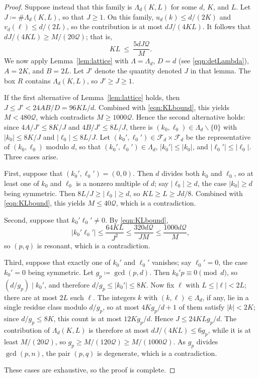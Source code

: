 \documentclass[12pt]{amsart}
\theoremstyle{definition}
\begin{document}
\begin{proof}
Suppose instead that this family is $\Lambda_d(K,L)$ for some $d$, $K$, and $L$.  Let $J\coloneq \#\Lambda_d(K,L)$, so that $J\ge1$.  On this family, $u_d(k)\le d/(2K)$ and $v_d(\ell)\le d/(2L)$, so the contribution is at most $dJ/(4KL)$.  It follows that $dJ/(4KL)\ge M/(20 \mathcal{Q})$; that is,
\begin{equation}
\label{eqn:KLbound}
KL\ \le\ \frac{5 d J \mathcal{Q}}{M}.
\end{equation}
We now apply Lemma~\ref{lem:lattice} with $\Lambda=\Lambda_d$, $D=d$ (see \eqref{eqn:detLambda}), $A=2K$, and $B=2L$.  Let $J'$ denote the quantity denoted $J$ in that lemma.  The box $R$ contains $\Lambda_d(K,L)$, so $J'\ge J\ge1$.

If the first alternative of Lemma~\ref{lem:lattice} holds, then $J\le J'<24AB/D=96KL/d$.  Combined with \eqref{eqn:KLbound}, this yields $M<480 \mathcal{Q}$, which contradicts $M\ge1000 \mathcal{Q}$.  Hence the second alternative holds: since $4A/J'\le8K/J$ and $4B/J'\le8L/J$, there is $(k_0,\ell_0)\in\Lambda_d\smallsetminus\{0\}$ with $|k_0|\le8K/J$ and $|\ell_0|\le8L/J$.  Let $(k_0',\ell_0')\in\mathcal{F}_d\times\mathcal{F}_d$ be the representative of $(k_0,\ell_0)$ modulo $d$, so that $(k_0',\ell_0')\in\Lambda_d$, $|k_0'|\le|k_0|$, and $|\ell_0'|\le|\ell_0|$.  Three cases arise.

First, suppose that $(k_0',\ell_0')=(0,0)$.  Then $d$ divides both $k_0$ and $\ell_0$, so at least one of $k_0$ and $\ell_0$ is a nonzero multiple of $d$; say $|\ell_0|\ge d$, the case $|k_0|\ge d$ being symmetric.  Then $8L/J\ge|\ell_0|\ge d$, so $KL\ge L\ge Jd/8$.  Combined with \eqref{eqn:KLbound}, this yields $M\le40 \mathcal{Q}$, which is a contradiction.

Second, suppose that $k_0'\ell_0'\ne0$.  By \eqref{eqn:KLbound},
\[
|k_0'\ell_0'|\le\frac{64 KL}{J^2}\le\frac{320 d \mathcal{Q}}{J M}\le\frac{1000 d \mathcal{Q}}{M},
\]
so $(p,q)$ is resonant, which is a contradiction.

Third, suppose that exactly one of $k_0'$ and $\ell_0'$ vanishes; say $\ell_0'=0$, the case $k_0'=0$ being symmetric.  Let $g_p\coloneq \gcd(p,d)$.  Then $k_0'p\equiv0\pmod d$, so $(d/g_p)\mid k_0'$, and therefore $d/g_p\le|k_0'|\le8K$.  Now fix $\ell$ with $L\le|\ell|<2L$; there are at most $2L$ such $\ell$.  The integers $k$ with $(k,\ell)\in\Lambda_d$, if any, lie in a single residue class modulo $d/g_p$, so at most $4Kg_p/d+1$ of them satisfy $|k|<2K$; since $d/g_p\le8K$, this count is at most $12Kg_p/d$.  Hence $J\le24KLg_p/d$.  The contribution of $\Lambda_d(K,L)$ is therefore at most $dJ/(4KL)\le6g_p$, while it is at least $M/(20 \mathcal{Q})$, so $g_p\ge M/(120 \mathcal{Q})\ge M/(1000 \mathcal{Q})$.  As $g_p$ divides $\gcd(p,n)$, the pair $(p,q)$ is degenerate, which is a contradiction.

These cases are exhaustive, so the proof is complete.
\end{proof}
\end{document}
